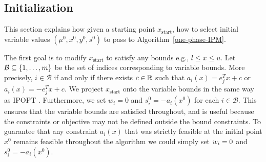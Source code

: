 \documentclass{article}
\begin{document}


\subsection{Initialization}\label{sec:initialization}


This section explains how given a starting point $x_{\text{start}}$, how to select initial variable values $(\mu^0,x^0, y^0, s^0)$ to pass to Algorithm~\ref{one-phase-IPM}.


The first goal is to modify $x_{\text{start}}$ to satisfy any bounds e.g., $l \le x \le u$. Let $\mathcal{B} \subseteq \{ 1, \dots, m \}$ be the set of indices corresponding to variable bounds. More precisely, $i \in \mathcal{B}$ if and only if there exists $c \in \mathbb{R}$ such that $a_i(x) = e_j^T x + c$ or $a_i(x) = -e_j^T x + c$. We project $x_{\text{start}}$ onto the variable bounds in the same way as IPOPT \cite[Section 3.7]{wachter2006implementation}. Furthermore, we set $w_i = 0$ and $s_i^{0} = -a_i(x^0)$ for each $i \in \mathcal{B}$. This ensures that the variable bounds are satisfied throughout, and is useful because the constraints or objective may not be defined outside the bound constraints. To guarantee that any constraint $a_i(x)$ that was strictly feasible at the initial point $x^{0}$ remains feasible throughout the algorithm we could simply set $w_i = 0$ and $s_i^{0} = -a_i(x^0)$.
 




\end{document}
